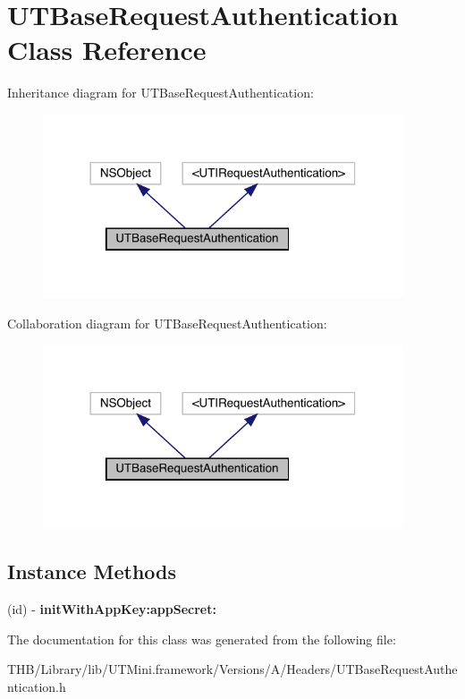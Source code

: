 \hypertarget{interface_u_t_base_request_authentication}{}\section{U\+T\+Base\+Request\+Authentication Class Reference}
\label{interface_u_t_base_request_authentication}


Inheritance diagram for U\+T\+Base\+Request\+Authentication\+:\nopagebreak
\begin{figure}[H]
\begin{center}
\leavevmode
\includegraphics[width=302pt]{interface_u_t_base_request_authentication__inherit__graph}
\end{center}
\end{figure}


Collaboration diagram for U\+T\+Base\+Request\+Authentication\+:\nopagebreak
\begin{figure}[H]
\begin{center}
\leavevmode
\includegraphics[width=302pt]{interface_u_t_base_request_authentication__coll__graph}
\end{center}
\end{figure}
\subsection*{Instance Methods}
\begin{DoxyCompactItemize}
\item 
\mbox{\label{interface_u_t_base_request_authentication_a55a912faf9de6b9040e933fb825b0f91}} 
(id) -\/ {\bfseries init\+With\+App\+Key\+:app\+Secret\+:}
\end{DoxyCompactItemize}


The documentation for this class was generated from the following file\+:\begin{DoxyCompactItemize}
\item 
T\+H\+B/\+Library/lib/\+U\+T\+Mini.\+framework/\+Versions/\+A/\+Headers/U\+T\+Base\+Request\+Authentication.\+h\end{DoxyCompactItemize}
